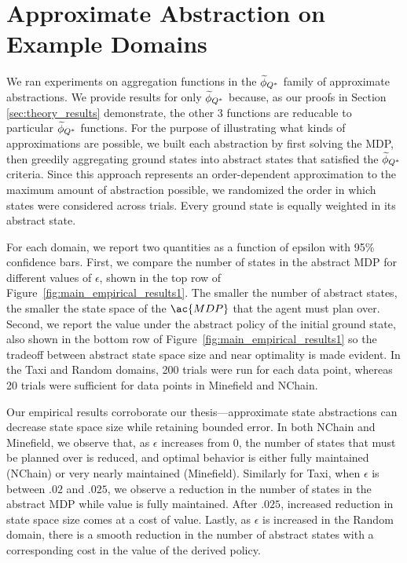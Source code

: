 \section{Approximate Abstraction on Example Domains}
We ran experiments on aggregation functions in the $\widetilde \phi_{Q^*}$ family of approximate abstractions. We provide results for only $\widetilde \phi_{Q^*}$ because, as our proofs in Section \ref{sec:theory_results} demonstrate, the other 3 functions are reducable to particular $\widetilde \phi_{Q^*}$ functions. For the purpose of illustrating what kinds of approximations are possible, we built each abstraction by first solving the MDP, then greedily aggregating ground states into abstract states that satisfied the $\widetilde \phi_{Q^*}$ criteria. Since this approach represents an order-dependent approximation to the maximum amount of abstraction possible, we randomized the order in which states were considered across trials. Every ground state is equally weighted in its abstract state.

For each domain, we report two quantities as a function of epsilon with 95\% confidence bars. First, we compare the number of states in the abstract \ac{MDP} for different values of $\epsilon$, shown in the top row of Figure~\ref{fig:main_empirical_results1}. The smaller the number of abstract states, the smaller the state space of the $\ac{MDP}$ that the agent must plan over. Second, we report the value under the abstract policy of the initial ground state, also shown in the bottom row of Figure~\ref{fig:main_empirical_results1} so the tradeoff between abstract state space size and near optimality is made evident. In the Taxi and Random domains, 200 trials were run for each data point, whereas 20 trials were sufficient for data points in Minefield and NChain.

Our empirical results corroborate our thesis---approximate state abstractions can decrease state space size while retaining bounded error. In both NChain and Minefield, we observe that, as $\epsilon$ increases from $0$, the number of states that must be planned over is reduced, and optimal behavior is either fully maintained (NChain) or very nearly maintained (Minefield). Similarly for Taxi, when $\epsilon$ is between $.02$ and $.025$, we observe a reduction in the number of states in the abstract \ac{MDP} while value is fully maintained. After $.025$, increased reduction in state space size comes at a cost of value. Lastly, as $\epsilon$ is increased in the Random domain, there is a smooth reduction in the number of abstract states with a corresponding cost in the value of the derived policy.

